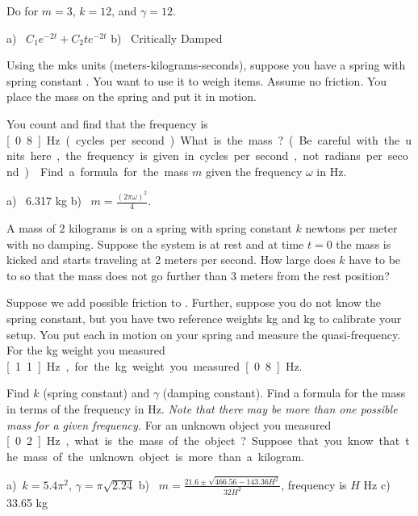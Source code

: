 \begin{exercise}
Do  for
$m=3$, $k=12$, and $\gamma=12$.
\end{exercise}
\comboSol{%
}
{%
a)~ $C_1e^{-2t} + C_2te^{-2t}$ \quad b)~ Critically Damped
}

\begin{exercise} \label{mv:exwt1}
Using the mks units (meters-kilograms-seconds),
suppose you have a spring with spring constant .
You want to use
it to weigh items.  Assume no friction.  You place the mass on
the spring and put it in motion.
\begin{tasks}
\task You count and find that the frequency is
\unit[0.8]{Hz} (cycles per second).  What is the mass? (Be careful with the units here, the frequency is given in cycles per second, not radians per second.)
\task Find a formula for the mass $m$
given the frequency $\omega$ in \unit{Hz}.
\end{tasks}
\end{exercise}
\comboSol{%
}
{%
a)~ 6.317 kg \quad b)~ $m = \frac{(2\pi \omega)^2}{4}$.
}

\begin{exercise}\ansMark%
A mass of $2$ kilograms is on a spring with spring constant $k$ newtons per
meter with no damping.  Suppose the system is at rest and at time $t=0$ the
mass is kicked and starts traveling at 2 meters per second.  How large
does $k$ have to be to so that the mass does not go further than 3 meters
from the rest position?
\end{exercise}

\begin{exercise}
Suppose we add possible friction to .
Further, suppose you do not know the spring constant, but you have
two reference weights \unit[1]{kg} and \unit[2]{kg} to calibrate your setup.
You put each in motion on your spring and measure the
quasi-frequency.  For the \unit[1]{kg}
weight you measured \unit[1.1]{Hz}, for the \unit[2]{kg} weight you
measured \unit[0.8]{Hz}.
\begin{tasks}
\task Find $k$ (spring constant) and $\gamma$ (damping constant).
\task Find a formula for the mass in terms of the frequency in Hz.  \emph{Note that
there may be more than one possible mass for a given frequency.}
\task For an unknown object you measured \unit[0.2]{Hz}, what is the mass of the
object?  Suppose that you know that the mass of the unknown object
is more than a kilogram.
\end{tasks}
\end{exercise}
\comboSol{%
}
{%
a)~$k =5.4\pi^2$, $\gamma=\pi\sqrt{2.24}$ \quad
b)~ $m = \frac{21.6 \pm \sqrt{466.56 - 143.36H^2}}{32H^2}$, frequency is $H$ Hz \quad
c)~ 33.65 kg
}

